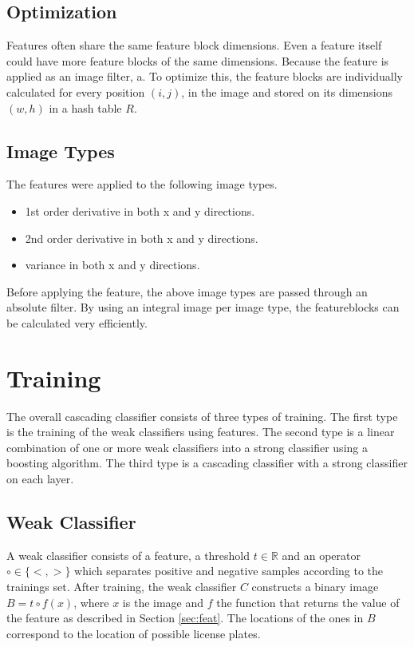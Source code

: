 \documentclass[a4paper,11pt]{article}
\begin{document}
\subsection{Optimization} \label{sec:opt}
Features often share the same feature block dimensions. Even a feature
itself could have more feature blocks of the same dimensions. Because the
feature is applied as an image filter, a.
To optimize this, the feature blocks are individually calculated for every
position $(i,j)$, in the image and stored on its dimensions $(w,h)$ in a hash
table $R$.

\subsection{Image Types} \label{sec:image}
The features were applied to the following image types.
\begin{itemize}
	\item{1st order derivative in both x and y directions.}
	\item{2nd order derivative in both x and y directions.}
	\item{variance in both x and y directions.}
\end{itemize}
Before applying the feature, the above image types are passed through an
absolute filter. By using an integral image \cite{viola} per image type, the
featureblocks can be calculated very efficiently.


\section{Training} \label{sec:train}
The overall cascading classifier consists of three types of training. The first
type is the training of the weak classifiers using features. The second type is
a linear combination of one or more weak classifiers into a strong classifier
using a boosting algorithm. The third type is a cascading classifier
with a strong classifier on each layer.

\subsection{Weak Classifier} \label{sec:weak}
A weak classifier consists of a feature, a threshold $t \in \mathbb{R}$ and an
operator $\circ \in \{<, >\}$ which separates positive and negative samples
according to the trainings set. After training, the weak classifier $C$
constructs a binary image $B = t \circ f(x)$, where $x$ is the image and $f$
the function that returns the value of the feature as described in 
Section \ref{sec:feat}. The locations of the ones in $B$ correspond to the location of
possible license plates.
\end{document}
